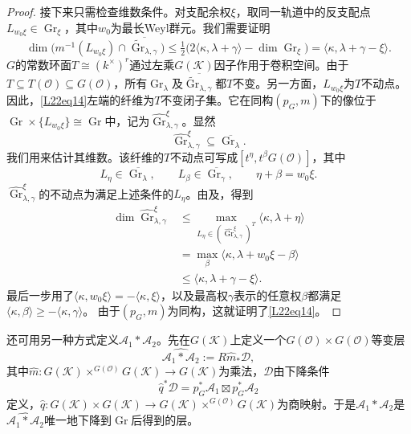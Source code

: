 \begin{proof}
接下来只需检查维数条件。对支配余权$\xi$，取同一轨道中的反支配点$L_{w_0\xi}\in\operatorname{Gr}_\xi$，其中$w_0$为最长Weyl群元。我们需要证明
\begin{equation}\tag{1.4}\label{L22eq14}
\dim\bigl(m^{-1}(L_{w_0\xi})\cap\overline{\widetilde{\operatorname{Gr}}_{\lambda,\gamma}}\bigr)\le\tfrac12\bigl(2\langle\kappa,\lambda+\gamma\rangle-\dim\operatorname{Gr}_\xi\bigr)=\langle\kappa,\lambda+\gamma-\xi\rangle.
\end{equation}
$G$的常数环面$T\cong(k^\times)^r$通过左乘$G(\mathcal K)$因子作用于卷积空间。由于$T\subseteq T(\mathcal O)\subseteq G(\mathcal O)$，所有$\operatorname{Gr}_\lambda$及$\overline{\widetilde{\operatorname{Gr}}_{\lambda,\gamma}}$都$T$不变。另一方面，$L_{w_0\xi}$为$T$不动点。因此，\eqref{L22eq14}左端的纤维为$T$不变闭子集。它在同构$(p_G,m)$下的像位于$\operatorname{Gr}\times\{L_{w_0\xi}\}\cong\operatorname{Gr}$中，记为$\widehat{\operatorname{Gr}}^\xi_{\lambda,\gamma}$。显然
\[\widehat{\operatorname{Gr}}^\xi_{\lambda,\gamma}\subseteq\overline{\operatorname{Gr}_\lambda}.\]
我们用来估计其维数。该纤维的$T$不动点可写成$[t^\eta,t^\beta G(\mathcal O)]$，其中
\[L_\eta\in\overline{\operatorname{Gr}_\lambda},\qquad L_\beta\in\overline{\operatorname{Gr}_\gamma},\qquad\eta+\beta=w_0\xi.\]
$\widehat{\operatorname{Gr}}^\xi_{\lambda,\gamma}$的不动点为满足上述条件的$L_\eta$。由及，得到
\begin{align*}
\dim\widehat{\operatorname{Gr}}^\xi_{\lambda,\gamma}
&\le\max_{L_\eta\in(\widehat{\operatorname{Gr}}^\xi_{\lambda,\gamma})^T}\langle\kappa,\lambda+\eta\rangle\\
&=\max_{\beta}\langle\kappa,\lambda+w_0\xi-\beta\rangle\\
&\le\langle\kappa,\lambda+\gamma-\xi\rangle.
\end{align*}
最后一步用了$\langle\kappa,w_0\xi\rangle=-\langle\kappa,\xi\rangle$，以及最高权$\gamma$表示的任意权$\beta$都满足$\langle\kappa,\beta\rangle\ge-\langle\kappa,\gamma\rangle$。
由于$(p_G,m)$为同构，这就证明了\eqref{L22eq14}。
\end{proof}

还可用另一种方式定义$\mathcal A_1*\mathcal A_2$。先在$G(\mathcal K)$上定义一个$G(\mathcal O)\times G(\mathcal O)$等变层
\[\widehat{\mathcal A_1*\mathcal A_2}:=R\widehat m_*\mathcal D,\]
其中$\widehat m:G(\mathcal K)\times^{G(\mathcal O)}G(\mathcal K)\to G(\mathcal K)$为乘法，$\mathcal D$由下降条件
\[\widehat q^*\mathcal D=p_G^*\mathcal A_1\boxtimes p_G^*\mathcal A_2\]
定义，$\widehat q:G(\mathcal K)\times G(\mathcal K)\to G(\mathcal K)\times^{G(\mathcal O)}G(\mathcal K)$为商映射。于是$\mathcal A_1*\mathcal A_2$是$\widehat{\mathcal A_1*\mathcal A_2}$唯一地下降到$\operatorname{Gr}$后得到的层。

